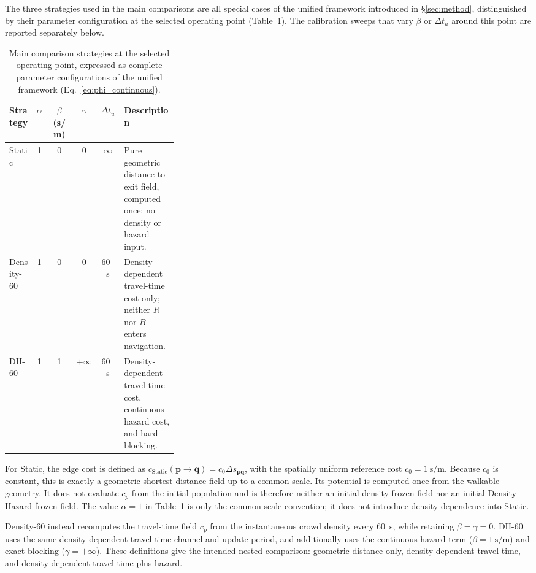 \documentclass[preprint,12pt]{elsarticle}
\begin{document}
The three strategies used in the main comparisons are all special cases
of the unified framework introduced in \S\ref{sec:method}, distinguished
by their parameter configuration at the selected operating point
(Table~\ref{tab:strategy_mapping}). The calibration sweeps that vary
$\beta$ or $\Delta t_u$ around this point are reported separately below.

\begin{table}[htbp]
\centering
\small
\setlength{\tabcolsep}{5pt}
\caption{Main comparison strategies at the selected operating point,
expressed as complete parameter configurations of the unified framework
(Eq.~\ref{eq:phi_continuous}).}
\label{tab:strategy_mapping}
\begin{tabular}{lccccp{0.32\linewidth}}
\toprule
\textbf{Strategy} & $\alpha$ & $\beta$ (s/m) & $\gamma$ & $\Delta t_u$ & \textbf{Description} \\
\midrule
Static     & 1 & 0 & 0   & $\infty$    & Pure geometric distance-to-exit field, computed once; no density or hazard input. \\
Density-60 & 1 & 0 & 0   & \SI{60}{s} & Density-dependent travel-time cost only; neither $R$ nor $B$ enters navigation. \\
DH-60      & 1 & 1 & $+\infty$ & \SI{60}{s} & Density-dependent travel-time cost, continuous hazard cost, and hard blocking. \\
\bottomrule
\end{tabular}
\end{table}

For Static, the edge cost is defined as
$c_{\mathrm{Static}}(\mathbf{p}\to\mathbf{q})=
c_0\Delta s_{\mathbf{pq}}$, with the spatially uniform reference cost
$c_0=\SI{1}{\second\per\meter}$. Because $c_0$ is constant, this is
exactly a geometric shortest-distance field up to a common scale. Its
potential is computed once from the walkable geometry.
It does not evaluate $c_p$ from the initial population and is
therefore neither an initial-density-frozen field nor an
initial-Density--Hazard-frozen field. The value $\alpha=1$ in
Table~\ref{tab:strategy_mapping} is only the common scale convention;
it does not introduce density dependence into Static.

Density-60 instead recomputes the travel-time field $c_p$ from the
instantaneous crowd density every \SI{60}{s}, while retaining
$\beta=\gamma=0$. DH-60 uses the same density-dependent travel-time
channel and update period, and additionally uses the continuous hazard
term ($\beta=\SI{1}{\second\per\meter}$) and exact blocking
($\gamma=+\infty$). These definitions give the intended nested
comparison: geometric distance only, density-dependent travel time, and
density-dependent travel time plus hazard.
\end{document}
